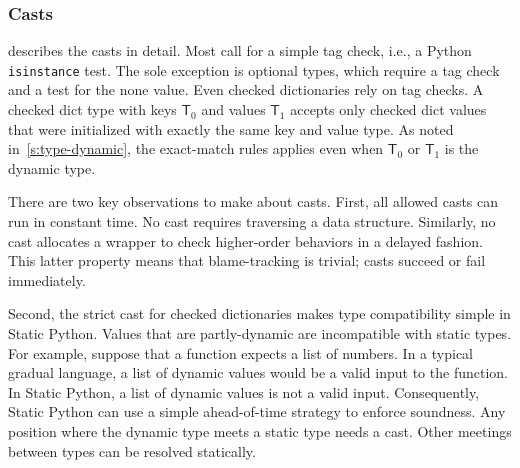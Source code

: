 \documentclass[english,cleveref,submission]{programming}
\newcommand{\SP}{Static Python}
\newcommand{\code}[1]{\texttt{#1}}
\newcommand{\typefont}[1]{\mathsf{#1}}
\newcommand{\sptype}{\typefont{T}}
\begin{document}
\subsubsection{Casts}

 describes the casts in detail.
Most call for a simple tag check, i.e., a Python \code{isinstance} test.
The sole exception is optional types, which require a tag check and a test for the none value.
Even checked dictionaries rely on tag checks.
A checked dict type with keys $\sptype_0$ and values $\sptype_1$ accepts only
checked dict values that were initialized with exactly the same key and value type.
As noted in~\cref{s:type-dynamic}, the exact-match rules applies even when $\sptype_0$
or $\sptype_1$ is the dynamic type.

There are two key observations to make about casts.
First, all allowed casts can run in constant time.
No cast requires traversing a data structure.
Similarly, no cast allocates a wrapper to check higher-order behaviors in a delayed fashion.
This latter property means that blame-tracking is trivial;
casts succeed or fail immediately.

Second, the strict cast for checked dictionaries makes type compatibility simple in \SP{}.
Values that are partly-dynamic are incompatible with static types.
For example, suppose that a function expects a list of numbers.
In a typical gradual language, a list of dynamic values would be a valid input to the function.
In \SP{}, a list of dynamic values is not a valid input.
Consequently, \SP{} can use a simple ahead-of-time strategy to enforce soundness.
Any position where the dynamic type meets a static type needs a cast.
Other meetings between types can be resolved statically.
\end{document}
